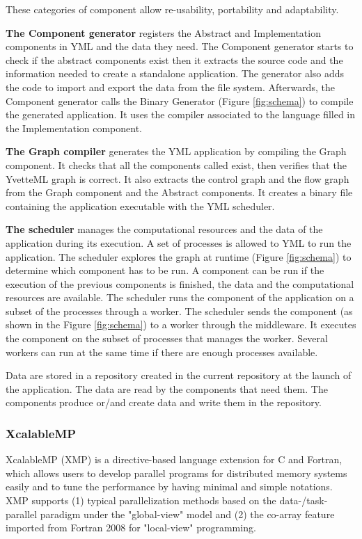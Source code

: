 These categories of component allow re-usability, portability and adaptability.

\textbf{The Component generator} registers the Abstract and Implementation components in YML and the data they need.
The Component generator starts to check if the abstract components exist then it extracts the source code and the information needed to create a standalone application.
The generator also adds the code to import and export the data from the file system.
Afterwards, the Component generator calls the Binary Generator (Figure \ref{fig:schema}) to compile the generated application.
It uses the compiler associated to the language filled in the Implementation component.

\textbf{The Graph compiler} generates the YML application by compiling the Graph component.
It checks that all the components called exist, then verifies that the YvetteML graph is correct.
It also extracts the control graph and the flow graph from the Graph component and the Abstract components.
It creates a binary file containing the application executable with the YML scheduler.

\textbf{The scheduler} manages the computational resources and the data of the application during its execution.
A set of processes is allowed to YML to run the application.
The scheduler explores the graph at runtime (Figure \ref{fig:schema}) to determine which component has to be run.
A component can be run if the execution of the previous components is finished, the data and the computational resources are available.
The scheduler runs the component of the application on a subset of the processes through a worker.
The scheduler sends the component (as shown in the Figure \ref{fig:schema}) to a worker through the middleware.
It executes the component on the subset of processes that manages the worker.
Several workers can run at the same time if there are enough processes available.

Data are stored in a repository created in the current repository at the launch of the application.
The data are read by the components that need them.
The components produce or/and create data and write them in the repository.

\subsubsection{XcalableMP}
XcalableMP (XMP) \cite{XMP} is a directive-based language extension for C and Fortran,  which allows users to develop parallel programs for distributed memory systems easily and to tune the performance by having minimal and simple notations.
XMP supports (1) typical parallelization methods based on the data-/task-parallel paradigm under the "global-view" model and (2) the co-array feature imported from Fortran 2008 for "local-view" programming.

